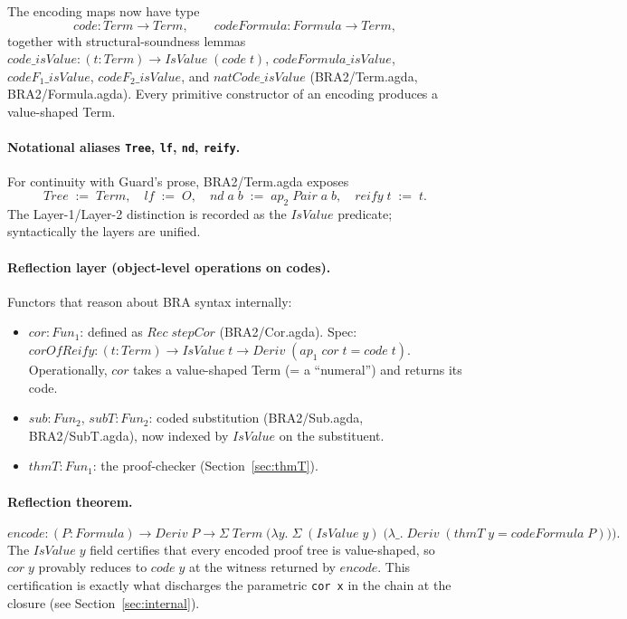 \documentclass[11pt]{article}
\begin{document}
The encoding maps now have type
\[
  \mathit{code} : \mathit{Term} \to \mathit{Term}, \qquad
  \mathit{codeFormula} : \mathit{Formula} \to \mathit{Term},
\]
together with structural-soundness lemmas
$\mathit{code\_isValue} : (t : \mathit{Term}) \to \mathit{IsValue}\;(\mathit{code}\;t)$,
$\mathit{codeFormula\_isValue}$, $\mathit{codeF}_1\_\mathit{isValue}$,
$\mathit{codeF}_2\_\mathit{isValue}$, and $\mathit{natCode\_isValue}$
(BRA2/Term.agda, BRA2/Formula.agda).  Every primitive constructor of an
encoding produces a value-shaped Term.

\paragraph{Notational aliases \texttt{Tree}, \texttt{lf}, \texttt{nd}, \texttt{reify}.}
For continuity with Guard's prose, BRA2/Term.agda exposes
\[
  \mathit{Tree} \;:=\; \mathit{Term}, \quad
  \mathit{lf} \;:=\; O, \quad
  \mathit{nd}\;a\;b \;:=\; \mathit{ap}_2\;\mathit{Pair}\;a\;b, \quad
  \mathit{reify}\;t \;:=\; t.
\]
The Layer-1/Layer-2 distinction is recorded as the $\mathit{IsValue}$
predicate; syntactically the layers are unified.

\paragraph{Reflection layer (object-level operations on codes).}
Functors that reason about BRA syntax internally:
\begin{itemize}
  \item $\mathit{cor} : \mathit{Fun}_1$: defined as $\mathit{Rec}\;\mathit{stepCor}$
        (BRA2/Cor.agda).  Spec:
        $\mathit{corOfReify} : (t : \mathit{Term}) \to \mathit{IsValue}\;t \to
          \mathit{Deriv}\;(\mathit{ap}_1\;\mathit{cor}\;t = \mathit{code}\;t)$.
        Operationally, $\mathit{cor}$ takes a value-shaped Term (= a
        ``numeral'') and returns its code.
  \item $\mathit{sub} : \mathit{Fun}_2$, $\mathit{subT} : \mathit{Fun}_2$:
        coded substitution (BRA2/Sub.agda, BRA2/SubT.agda), now indexed
        by $\mathit{IsValue}$ on the substituent.
  \item $\mathit{thmT} : \mathit{Fun}_1$: the proof-checker
        (Section~\ref{sec:thmT}).
\end{itemize}

\paragraph{Reflection theorem.}
\[
  \mathit{encode} : (P : \mathit{Formula}) \to \mathit{Deriv}\;P \to
    \Sigma\;\mathit{Term}\;\bigl(\lambda y.\;
      \Sigma\;(\mathit{IsValue}\;y)\;\bigl(\lambda \_.\;\mathit{Deriv}\;
        (\mathit{thmT}\;y = \mathit{codeFormula}\;P)\bigr)\bigr).
\]
The $\mathit{IsValue}\;y$ field certifies that every encoded proof
tree is value-shaped, so $\mathit{cor}\;y$ provably reduces to
$\mathit{code}\;y$ at the witness returned by $\mathit{encode}$.  This
certification is exactly what discharges the parametric \verb|cor x|
in the chain at the closure (see Section~\ref{sec:internal}).
\end{document}
